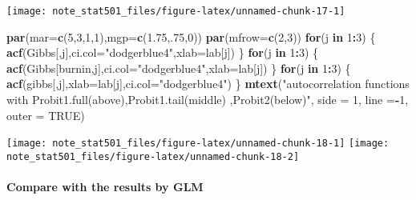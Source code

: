 \documentclass[
]{article}
\newenvironment{Shaded}{\begin{snugshade}}{\end{snugshade}}
\newcommand{\ControlFlowTok}[1]{\textcolor[rgb]{0.13,0.29,0.53}{\textbf{#1}}}
\newcommand{\DataTypeTok}[1]{\textcolor[rgb]{0.13,0.29,0.53}{#1}}
\newcommand{\DecValTok}[1]{\textcolor[rgb]{0.00,0.00,0.81}{#1}}
\newcommand{\FloatTok}[1]{\textcolor[rgb]{0.00,0.00,0.81}{#1}}
\newcommand{\KeywordTok}[1]{\textcolor[rgb]{0.13,0.29,0.53}{\textbf{#1}}}
\newcommand{\NormalTok}[1]{#1}
\newcommand{\OperatorTok}[1]{\textcolor[rgb]{0.81,0.36,0.00}{\textbf{#1}}}
\newcommand{\OtherTok}[1]{\textcolor[rgb]{0.56,0.35,0.01}{#1}}
\newcommand{\StringTok}[1]{\textcolor[rgb]{0.31,0.60,0.02}{#1}}
\begin{document}
\begin{center}\texttt{[image: note\_stat501\_files/figure-latex/unnamed-chunk-17-1]} \end{center}

\begin{Shaded}
\begin{Highlighting}[]
\KeywordTok{par}\NormalTok{(}\DataTypeTok{mar=}\KeywordTok{c}\NormalTok{(}\DecValTok{5}\NormalTok{,}\DecValTok{3}\NormalTok{,}\DecValTok{1}\NormalTok{,}\DecValTok{1}\NormalTok{),}\DataTypeTok{mgp=}\KeywordTok{c}\NormalTok{(}\FloatTok{1.75}\NormalTok{,.}\DecValTok{75}\NormalTok{,}\DecValTok{0}\NormalTok{))}
\KeywordTok{par}\NormalTok{(}\DataTypeTok{mfrow=}\KeywordTok{c}\NormalTok{(}\DecValTok{2}\NormalTok{,}\DecValTok{3}\NormalTok{))}
\ControlFlowTok{for}\NormalTok{(j }\ControlFlowTok{in} \DecValTok{1}\OperatorTok{:}\DecValTok{3}\NormalTok{) \{}
\KeywordTok{acf}\NormalTok{(Gibbs[,j],}\DataTypeTok{ci.col=}\StringTok{"dodgerblue4"}\NormalTok{,}\DataTypeTok{xlab=}\NormalTok{lab[j])}
\NormalTok{\}  }
\ControlFlowTok{for}\NormalTok{(j }\ControlFlowTok{in} \DecValTok{1}\OperatorTok{:}\DecValTok{3}\NormalTok{) \{}
\KeywordTok{acf}\NormalTok{(Gibbs[burnin,j],}\DataTypeTok{ci.col=}\StringTok{"dodgerblue4"}\NormalTok{,}\DataTypeTok{xlab=}\NormalTok{lab[j])}
\NormalTok{\} }
\ControlFlowTok{for}\NormalTok{(j }\ControlFlowTok{in} \DecValTok{1}\OperatorTok{:}\DecValTok{3}\NormalTok{) \{}
\KeywordTok{acf}\NormalTok{(gibbs[,j],}\DataTypeTok{xlab=}\NormalTok{lab[j],}\DataTypeTok{ci.col=}\StringTok{"dodgerblue4"}\NormalTok{)}
\NormalTok{\}}
\KeywordTok{mtext}\NormalTok{(}\StringTok{"autocorrelation functions with Probit1.full(above),Probit1.tail(middle) ,Probit2(below)"}\NormalTok{, }\DataTypeTok{side =} \DecValTok{1}\NormalTok{, }\DataTypeTok{line =}\OperatorTok{-}\DecValTok{1}\NormalTok{, }\DataTypeTok{outer =} \OtherTok{TRUE}\NormalTok{)}
\end{Highlighting}
\end{Shaded}

\begin{center}\texttt{[image: note\_stat501\_files/figure-latex/unnamed-chunk-18-1]} \texttt{[image: note\_stat501\_files/figure-latex/unnamed-chunk-18-2]} \end{center}

\hypertarget{compare-with-the-results-by-glm}{%
\paragraph{Compare with the results by
GLM}\label{compare-with-the-results-by-glm}}
\end{document}
